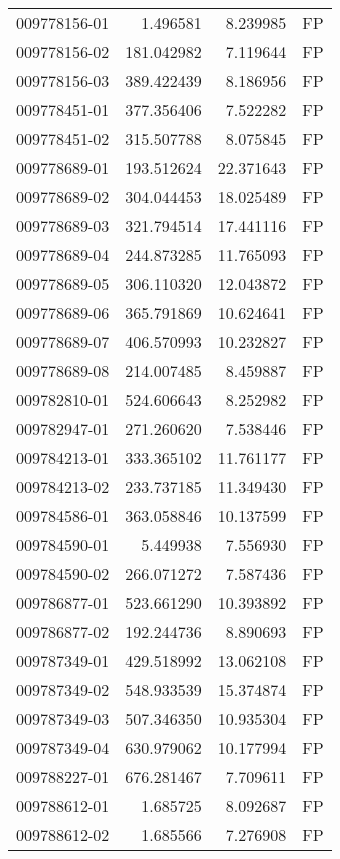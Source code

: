 \begin{tabular}{lrrl}
009778156-01 &    1.496581 &     8.239985 &   FP \\
009778156-02 &  181.042982 &     7.119644 &   FP \\
009778156-03 &  389.422439 &     8.186956 &   FP \\
009778451-01 &  377.356406 &     7.522282 &   FP \\
009778451-02 &  315.507788 &     8.075845 &   FP \\
009778689-01 &  193.512624 &    22.371643 &   FP \\
009778689-02 &  304.044453 &    18.025489 &   FP \\
009778689-03 &  321.794514 &    17.441116 &   FP \\
009778689-04 &  244.873285 &    11.765093 &   FP \\
009778689-05 &  306.110320 &    12.043872 &   FP \\
009778689-06 &  365.791869 &    10.624641 &   FP \\
009778689-07 &  406.570993 &    10.232827 &   FP \\
009778689-08 &  214.007485 &     8.459887 &   FP \\
009782810-01 &  524.606643 &     8.252982 &   FP \\
009782947-01 &  271.260620 &     7.538446 &   FP \\
009784213-01 &  333.365102 &    11.761177 &   FP \\
009784213-02 &  233.737185 &    11.349430 &   FP \\
009784586-01 &  363.058846 &    10.137599 &   FP \\
009784590-01 &    5.449938 &     7.556930 &   FP \\
009784590-02 &  266.071272 &     7.587436 &   FP \\
009786877-01 &  523.661290 &    10.393892 &   FP \\
009786877-02 &  192.244736 &     8.890693 &   FP \\
009787349-01 &  429.518992 &    13.062108 &   FP \\
009787349-02 &  548.933539 &    15.374874 &   FP \\
009787349-03 &  507.346350 &    10.935304 &   FP \\
009787349-04 &  630.979062 &    10.177994 &   FP \\
009788227-01 &  676.281467 &     7.709611 &   FP \\
009788612-01 &    1.685725 &     8.092687 &   FP \\
009788612-02 &    1.685566 &     7.276908 &   FP \\

\end{tabular}
